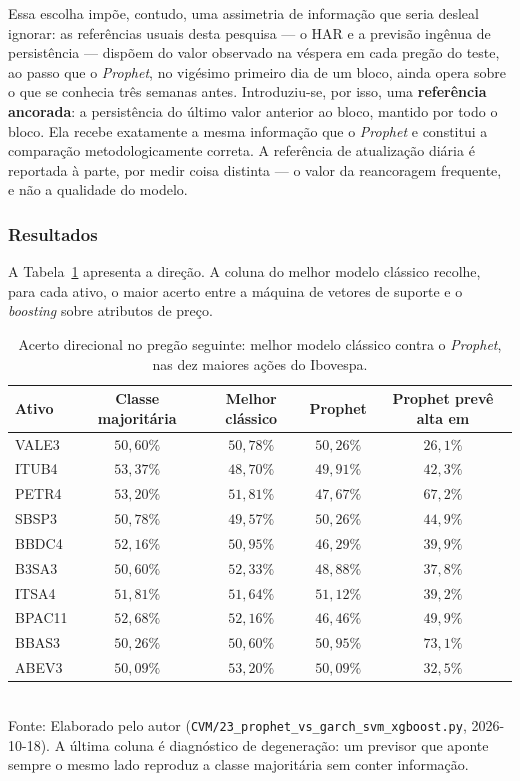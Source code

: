 Essa escolha impõe, contudo, uma assimetria de informação que seria desleal ignorar: as referências
usuais desta pesquisa --- o HAR e a previsão ingênua de persistência --- dispõem do valor observado
na véspera em cada pregão do teste, ao passo que o \textit{Prophet}, no vigésimo primeiro dia de um
bloco, ainda opera sobre o que se conhecia três semanas antes. Introduziu-se, por isso, uma
\textbf{referência ancorada}: a persistência do último valor anterior ao bloco, mantido por todo o
bloco. Ela recebe exatamente a mesma informação que o \textit{Prophet} e constitui a comparação
metodologicamente correta. A referência de atualização diária é reportada à parte, por medir coisa
distinta --- o valor da reancoragem frequente, e não a qualidade do modelo.

\subsubsection{Resultados}

A Tabela~\ref{tab:prophet_direcao} apresenta a direção. A coluna do melhor modelo clássico recolhe,
para cada ativo, o maior acerto entre a máquina de vetores de suporte e o \textit{boosting} sobre
atributos de preço.

\begin{table}[htpb]
\centering
\caption{Acerto direcional no pregão seguinte: melhor modelo clássico contra o \textit{Prophet}, nas dez maiores ações do Ibovespa.}
\label{tab:prophet_direcao}
\begin{tabular}{l c c c c}
\hline
\textbf{Ativo} & \textbf{Classe majoritária} & \textbf{Melhor clássico} & \textbf{Prophet} & \textbf{Prophet prevê alta em} \\ \hline
VALE3 & $50{,}60\%$ & $50{,}78\%$ & $50{,}26\%$ & $26{,}1\%$ \\
ITUB4 & $53{,}37\%$ & $48{,}70\%$ & $49{,}91\%$ & $42{,}3\%$ \\
PETR4 & $53{,}20\%$ & $51{,}81\%$ & $47{,}67\%$ & $67{,}2\%$ \\
SBSP3 & $50{,}78\%$ & $49{,}57\%$ & $50{,}26\%$ & $44{,}9\%$ \\
BBDC4 & $52{,}16\%$ & $50{,}95\%$ & $46{,}29\%$ & $39{,}9\%$ \\
B3SA3 & $50{,}60\%$ & $52{,}33\%$ & $48{,}88\%$ & $37{,}8\%$ \\
ITSA4 & $51{,}81\%$ & $51{,}64\%$ & $51{,}12\%$ & $39{,}2\%$ \\
BPAC11 & $52{,}68\%$ & $52{,}16\%$ & $46{,}46\%$ & $49{,}9\%$ \\
BBAS3 & $50{,}26\%$ & $50{,}60\%$ & $50{,}95\%$ & $73{,}1\%$ \\
ABEV3 & $50{,}09\%$ & $53{,}20\%$ & $50{,}09\%$ & $32{,}5\%$ \\
\hline
\end{tabular}
\vspace{0.2cm}
{\small \\ Fonte: Elaborado pelo autor (\texttt{CVM/23\_prophet\_vs\_garch\_svm\_xgboost.py}, 2026-10-18). A última coluna é diagnóstico de degeneração: um previsor que aponte sempre o mesmo lado reproduz a classe majoritária sem conter informação.}
\end{table}

